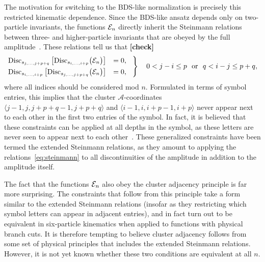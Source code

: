 \documentclass[11pt]{article}
\def\ket#1{\langle #1 \rangle}
\def\acoords{$\mathcal{A}$-coordinates}
\def\draftnote#1{{\bf [#1]}}
\begin{document}
The motivation for switching to the BDS-like normalization is precisely this restricted kinematic dependence. Since the BDS-like ansatz depends only on two-particle invariants, the functions ${\cal E}_n$ directly inherit the Steinmann relations between three- and higher-particle invariants that are obeyed by the full amplitude~\cite{Steinmann,Steinmann2,Cahill:1973qp,Caron-Huot:2016owq,Dixon:2016nkn}. These relations tell us that \draftnote{check}
\begin{equation} \label{eq:steinmann}
\begin{rcases}
\text{Disc}_{s_{j,\dots,j+p+q}}\left[\text{Disc}_{s_{i,\dots,i+p}} \big({\cal E}_n \big) \right] &= 0, \hspace{.3cm} \\
\text{Disc}_{s_{i,\dots,i+p}}\left[\text{Disc}_{s_{j,\dots,j+p+q}} \big({\cal E}_n \big) \right] &= 0, 
\end{rcases} \quad 
\begin{gathered} 0 < j-i \leq p \text{\ \ or\ \ } q < i-j  \leq p+q, \end{gathered}
\end{equation}
where all indices should be considered mod $n$. Formulated in terms of symbol entries, this implies that the cluster \acoords\ $\ket{j-1,j,j+p+q-1,j+p+q}$ and $\ket{i-1,i,i+p-1,i+p}$ never appear next to each other in the first two entries of the symbol. In fact, it is believed that these constraints can be applied at all depths in the symbol, as these letters are never seen to appear next to each other~\cite{Caron-Huot:2016owq,Dixon:2016nkn,Caron-Huot:2018dsv,cosmic_galois_paper,all_orders_adjacency}. These generalized constraints have been termed the extended Steinmann relations, as they amount to applying the relations~\eqref{eq:steinmann} to all discontinuities of the amplitude in addition to the amplitude itself. 

The fact that the functions ${\cal E}_n$ also obey the cluster adjacency principle is far more surprising. The constraints that follow from this principle take a form similar to the extended Steinmann relations (insofar as they restricting which symbol letters can appear in adjacent entries), and in fact turn out to be equivalent in six-particle kinematics when applied to functions with physical branch cuts. It is therefore tempting to believe cluster adjacency follows from some set of physical principles that includes the extended Steinmann relations. However, it is not yet known whether these two conditions are equivalent at all $n$. 
\end{document}
